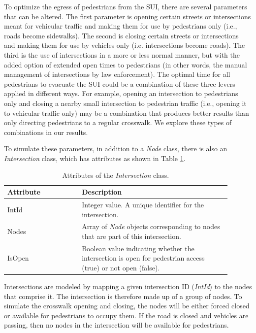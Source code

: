 \documentclass[12pt]{article}
\begin{document}
To optimize the egress of pedestrians from the SUI, there are
several parameters that can be altered. The first parameter is opening certain
streets or intersections meant for vehicular traffic and making them for use by
pedestrians only (i.e., roads become sidewalks). The second is closing certain
streets or intersections and making them for use by vehicles only (i.e.
intersections become roads). The third is the use of intersections in a more
or less normal manner, but with the added option of extended open times to pedestrians (in
other words, the manual management of intersections by law enforcement).
The optimal time for all pedestrians to evacuate
the SUI could be a combination of these three levers applied in different
ways. For example, opening an
intersection to pedestrians only and closing a nearby small intersection to
pedestrian traffic (i.e., opening it to vehicular traffic only) may be a
combination that produces better results than only directing pedestrians to a
regular crosswalk. We explore these types of combinations in our results.

To simulate these parameters, in addition to a \textit{Node} class, there is
also an \textit{Intersection} class, which has attributes as shown in Table
\ref{table:intersection}.

\def\arraystretch{1.5}
\begin{table}[hb!]
  \centering
    \begin{tabular}{p{0.3\linewidth}p{0.6\linewidth}}
     \hline
     Attribute & Description \\
     \hline
     IntId & Integer value. A unique identifier for the intersection. \\
     Nodes & Array of \textit{Node} objects corresponding to nodes
             that are part of this intersection. \\
     IsOpen  & Boolean value indicating whether the intersection is open
             for pedestrian access (true) or not open (false). \\
     \hline
    \end{tabular}
    \caption{Attributes of the \textit{Intersection} class.}
  \label{table:intersection}
\end{table}

Intersections are modeled by mapping a given intersection ID (\textit{IntId})
to the nodes that comprise it. The intersection is therefore made up of a
group of nodes. To simulate the crosswalk opening and closing, the nodes will
be either forced closed or available for pedestrians to occupy them. If the
road is closed and vehicles are passing, then no nodes in the intersection
will be available for pedestrians.
\end{document}
